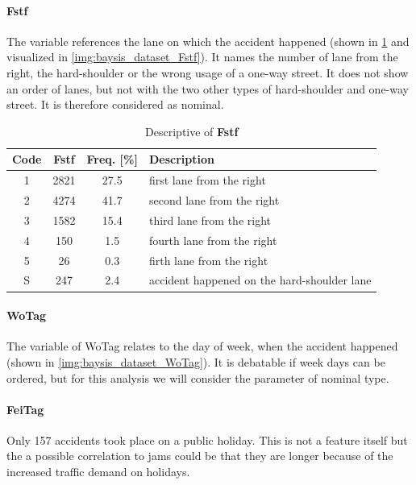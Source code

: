 \paragraph{Fstf}
\label{baysis_dataset_Fstf}
The variable references the lane on which the accident happened (shown in \cref{tbl:baysis_dataset_Fstf} and visualized in \cref{img:baysis_dataset_Fstf}). It names the number of lane from the right, the hard-shoulder or the wrong usage of a one-way street. It does not show an order of lanes, but not with the two other types of hard-shoulder and one-way street. It is therefore considered as nominal.
\begin{table}[ht]
	\centering
	\small
	\begin{tabular}{c|c|c|l}
		\toprule
		Code & \textbf{Fstf} & Freq. [\%] & Description \\ 
		\midrule  
		1 & 2821 	& 27.5 	& first lane from the right \\
		2 & 4274 	& 41.7 	& second lane from the right \\
		3 & 1582 	& 15.4 	& third lane from the right \\
		4 & 150 	& 1.5 	& fourth lane from the right \\
		5 & 26 		& 0.3 	& firth lane from the right \\ 
 		S & 247 	& 2.4 	& accident happened on the hard-shoulder lane \\ 
		\bottomrule
	\end{tabular}
	\caption{Descriptive of \textbf{Fstf}}
	\label{tbl:baysis_dataset_Fstf}
	\vspace{-8mm}
\end{table}
    
\paragraph{WoTag}
\label{baysis_dataset_WoTag}
The variable of WoTag relates to the day of week, when the accident happened (shown in \cref{img:baysis_dataset_WoTag}). It is debatable if week days can be ordered, but for this analysis we will consider the parameter of nominal type.

\paragraph{FeiTag}
\label{baysis_dataset_FeiTag}
Only 157 accidents took place on a public holiday. This is not a feature itself but the a possible correlation to jams could be that they are longer because of the increased traffic demand on holidays.
	
